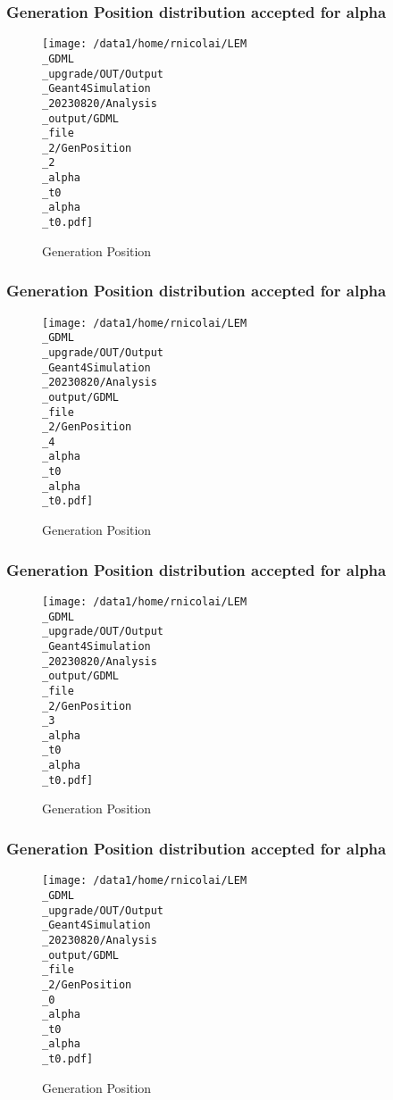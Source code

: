\documentclass[8pt]{beamer}
\begin{document}
            \begin{frame}
                \frametitle{Generation Position distribution accepted for alpha}
            
        \begin{figure}[h]
            \centering
            \texttt{[image: /data1/home/rnicolai/LEM\\\_GDML\\\_upgrade/OUT/Output\\\_Geant4Simulation\\\_20230820/Analysis\\\_output/GDML\\\_file\\\_2/GenPosition\\\_2\\\_alpha\\\_t0\\\_alpha\\\_t0.pdf]}
            \caption{Generation Position}
        \end{figure}
        
            \end{frame}
            
            \begin{frame}
                \frametitle{Generation Position distribution accepted for alpha}
            
        \begin{figure}[h]
            \centering
            \texttt{[image: /data1/home/rnicolai/LEM\\\_GDML\\\_upgrade/OUT/Output\\\_Geant4Simulation\\\_20230820/Analysis\\\_output/GDML\\\_file\\\_2/GenPosition\\\_4\\\_alpha\\\_t0\\\_alpha\\\_t0.pdf]}
            \caption{Generation Position}
        \end{figure}
        
            \end{frame}
            
            \begin{frame}
                \frametitle{Generation Position distribution accepted for alpha}
            
        \begin{figure}[h]
            \centering
            \texttt{[image: /data1/home/rnicolai/LEM\\\_GDML\\\_upgrade/OUT/Output\\\_Geant4Simulation\\\_20230820/Analysis\\\_output/GDML\\\_file\\\_2/GenPosition\\\_3\\\_alpha\\\_t0\\\_alpha\\\_t0.pdf]}
            \caption{Generation Position}
        \end{figure}
        
            \end{frame}
            
            \begin{frame}
                \frametitle{Generation Position distribution accepted for alpha}
            
        \begin{figure}[h]
            \centering
            \texttt{[image: /data1/home/rnicolai/LEM\\\_GDML\\\_upgrade/OUT/Output\\\_Geant4Simulation\\\_20230820/Analysis\\\_output/GDML\\\_file\\\_2/GenPosition\\\_0\\\_alpha\\\_t0\\\_alpha\\\_t0.pdf]}
            \caption{Generation Position}
        \end{figure}
        
            \end{frame}
            
\end{document}

